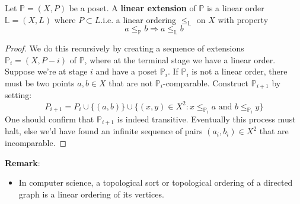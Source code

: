 \begin{definition}
    Let $\mathbb{P}=(X,P)$ be a poset. A \textbf{linear extension} of $\mathbb{P}$ is a linear order $\mathbb{L}=(X,L)$ where $P \subset L$.i.e. a linear ordering $\leq_{\mathbb{L}}$ on $X$ with property $$a \leq_{\mathbb{P}} b \Longrightarrow a \leq_{\mathbb{L}} b$$
\end{definition}
\begin{proof}
    We do this recursively by creating a sequence of extensions $\mathbb{P}_i=(X,P-i)$ of $\mathbb{P}$, where at the terminal stage we have a linear order. 
    Suppose we're at stage $i$ and have a poset $\mathbb{P}_i$. 
    If $\mathbb{P}_i$ is not a linear order, there must be two points $a,b \in X$ that are not $\mathbb{P}_i$-comparable. 
    Construct $\mathbb{P}_{i+1}$ by setting:
    $$P_{i+1} = P_i \cup \{(a,b)\}\cup \{(x,y)\in X^2: x \leq_{\mathbb{P}_i} a \text{ and } b \leq_{\mathbb{P}_i} y\}$$
    One should confirm that $\mathbb{P}_{i+1}$ is indeed transitive. 
    Eventually this process must halt, else we'd have found an infinite sequence of pairs $(a_i,b_i)\in X^2$ that are incomparable.
\end{proof}
\textbf{Remark}:
\begin{itemize}
    \item In computer science, a topological sort or topological ordering of a directed graph is a linear ordering of its vertices.
\end{itemize}